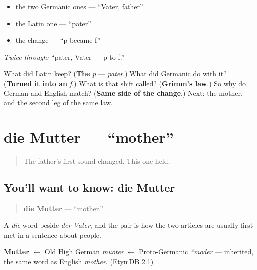 \begin{itemize}
\raggedright
  \item the two Germanic ones — \textquotedblleft{}Vater, father\textquotedblright{}
  \item the Latin one — \textquotedblleft{}pater\textquotedblright{}
  \item the change — \textquotedblleft{}p became f\textquotedblright{}
\end{itemize}

\emph{Twice through:} \textquotedblleft{}pater, Vater — p to f.\textquotedblright{}

\begin{tcolorbox}[breakable,colback=teal!4,colframe=teal!35!black,title={Before you move on}]
What did Latin keep? (\textbf{The} \emph{p} — \emph{pater}.) What did Germanic do with it? (\textbf{Turned it into an} \emph{f}.) What is that shift called? (\textbf{Grimm's law}.) So why do German and English match? (\textbf{Same side of the change}.) Next: the mother, and the second leg of the same law.
\end{tcolorbox}
\section[die Mutter]{die Mutter — \textquotedblleft{}mother\textquotedblright{}}

\label{lesson:GE-C10-mutter}



\begin{quote}
The father's first sound changed. This one held.
\end{quote}

\subsection*{You'll want to know: die Mutter}
\begin{quote}
\textbf{die Mutter} — \textquotedblleft{}mother.\textquotedblright{}
\end{quote}

A \emph{die}-word beside \emph{der Vater}, and the pair is how the two articles are usually first met in a sentence about people.

\begin{cousinweb}
\textbf{Mutter} $\leftarrow$ Old High German \emph{muoter} $\leftarrow$ Proto-Germanic \emph{*mōdēr} — inherited, the same word as English \emph{mother}. (EtymDB 2.1)
\end{cousinweb}

